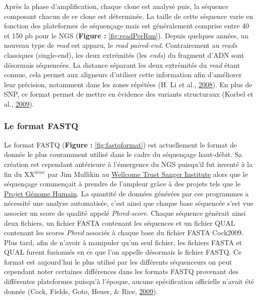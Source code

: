 \documentclass[12pt,twoside]{reedthesis}
\theoremstyle{definition}
\theoremstyle{definition}
\theoremstyle{remark}
\begin{document}
  Après la phase d'amplification, chaque clone est analysé puis, la
  séquence composant chacun de ce clone est déterminée. La taille de cette
  séquence varie en fonction des plateformes de séquençage mais est
  généralement comprise entre 40 et 150 pb pour le NGS (\textbf{Figure :
  }\ref{fig:readPerRun}). Depuis quelques années, un nouveau type de
  \emph{read} est apparu, le \emph{read} \emph{paired-end}. Contrairement
  au \emph{reads} classiques (single-end), les deux extrémités (les
  \emph{ends}) du fragment d'ADN sont désormais séquencées. La distance
  séparant les deux extrémités du \emph{read} étant connue, cela permet
  aux aligneurs d'utiliser cette information afin d'améliorer leur
  précision, notamment dans les zones répétées (H. Li et al.,
  \protect\hyperlink{ref-Li2008}{2008}). En plus de SNP, ce format permet
  de mettre en évidence des variants structuraux (Korbel et al.,
  \protect\hyperlink{ref-Korbel2009}{2009}).
  
  \newpage
  
  \subsubsection{Le format FASTQ}\label{fastq}
  
  Le format FASTQ (\textbf{Figure : }\ref{fig:fastqformat}) est
  actuellement le format de donnée le plus couramment utilisé dans le
  cadre du séquençage haut-débit. Sa création est cependant antérieure à
  l'émergence du NGS puisqu'il fut inventé à la fin du XX\(^{ième}\) par
  Jim Mullikin au
  \href{https://fr.wikipedia.org/wiki/Wellcome_Trust_Sanger_Institute}{Wellcome
  Trust Sanger Institute} alors que le séquençage commençait à prendre de
  l'ampleur grâce à des projets tels que le
  \href{https://fr.wikipedia.org/wiki/Projet_G\%C3\%A9nome_Humain}{Projet
  Génome Humain}. La quantité de données générées par ces programmes a
  nécessité une analyse automatisée, c'est ainsi que chaque base séquencée
  s'est vue associer un score de qualité appelé \emph{Phred-score}. Chaque
  séquence générait ainsi deux fichiers, un fichier FASTA contenant les
  séquences et un fichier QUAL contenant les scores \emph{Phred} associés
  à chaque base du fichier FASTA Cock2009. Plus tard, afin de n'avoir à
  manipuler qu'un seul fichier, les fichiers FASTA et QUAL furent
  fusionnés en ce que l'on appelle désormais le fichier FASTQ. Ce format
  est aujourd'hui le plus utilisé par les différents séquenceurs on peut
  cependant noter certaines différences dans les formats FASTQ provenant
  des différentes plateformes puisqu'à l'époque, aucune spécification
  officielle n'avait été donnée (Cock, Fields, Goto, Heuer, \& Rice,
  \protect\hyperlink{ref-Cock2009}{2009}).
  
\end{document}
